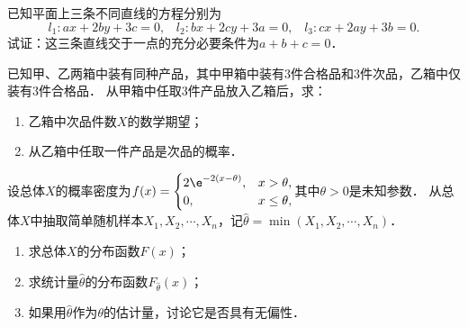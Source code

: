 \documentclass[plain,noanswer,medmath]{../../template/jnuexam}
\begin{document}

\begin{problem}
已知平面上三条不同直线的方程分别为
$$l_1:ax + 2by + 3c = 0,\;\;\;l_2:bx + 2cy + 3a = 0,\;\;\;l_3:cx + 2ay + 3b = 0.$$
试证：这三条直线交于一点的充分必要条件为$a + b + c = 0$．
\end{problem}



\begin{problem}
已知甲、乙两箱中装有同种产品，其中甲箱中装有$3$件合格品和$3$件次品，乙箱中仅装有$3$件合格品．
从甲箱中任取$3$件产品放入乙箱后，求：
\begin{enumerate}
\item 乙箱中次品件数$X$的数学期望；
\item 从乙箱中任取一件产品是次品的概率．
\end{enumerate}
\end{problem}



\begin{problem}
设总体$X$的概率密度为$f(x) = \begin{cases}
  2\e^{- 2(x - \theta)}, & x > \theta , \\
  0,                     & x \le \theta ,
\end{cases}$其中$\theta > 0$是未知参数．
从总体$X$中抽取简单随机样本$X_1,X_2, \cdots ,X_n$，记$\hat{\theta}= \min(X_1,X_2, \cdots ,X_n)$．
\begin{enumerate}
\item 求总体$X$的分布函数$F(x)$；
\item 求统计量$\hat{\theta}$的分布函数$F_{\hat{\theta}}(x)$；
\item 如果用$\hat{\theta}$作为$\theta$的估计量，讨论它是否具有无偏性．
\end{enumerate}
\end{problem}
\end{document}
